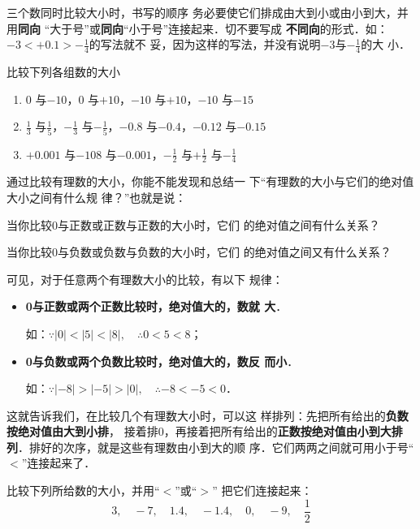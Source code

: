 \begin{rmk}
	三个数同时比较大小时，书写的顺序
	务必要使它们排成由大到小或由小到大，并用\textbf{同向}
	“大于号”或\textbf{同向}“小于号”连接起来．切不要写成
	\textbf{不同向}的形式．如：$-3<+0.1>-\frac{1}{4}$的写法就不
	妥，因为这样的写法，并没有说明$-3$与$-\frac{1}{4}$的大
	小．
\end{rmk}

\begin{ex}
	比较下列各组数的大小
	\begin{enumerate}
		\item $0$ 与$-10$，\quad $0$ 与$+10$，\quad $-10$ 与$+10$，\quad $-10$ 与$-15$
		\item $\frac{1}{3}$ 与$\frac{1}{5}$，\quad $-\frac{1}{3}$ 与$-\frac{1}{5}$，\quad $-0.8$ 与$-0.4$，\quad $-0.12$ 与$-0.15$
		\item $+0.001$ 与$-108$ 与$-0.001$，\quad $-\frac{1}{2}$ 与$+\frac{1}{2}$ 与$-\frac{1}{4}$
	\end{enumerate}
\end{ex}

通过比较有理数的大小，你能不能发现和总结一
下“有理数的大小与它们的绝对值大小之间有什么规
律？”也就是说：

当你比较0与正数或正数与正数的大小时，它们
的绝对值之间有什么关系？

当你比较0与负数或负数与负数的大小时，它们
的绝对值之间又有什么关系？

可见，对于任意两个有理数大小的比较，有以下
规律：
\begin{itemize}
	\item \textbf{0与正数或两个正数比较时，绝对值大的，数就
	大}．
	
	如：$\because |0|<|5|<|8|, \quad \therefore 0<5<8$；
	\item \textbf{0与负数或两个负数比较时，绝对值大的，数反
	而小}．
	
	如：$\because |-8|>|-5|>|0|, \quad \therefore -8<-5<0$．
\end{itemize}

这就告诉我们，在比较几个有理数大小时，可以这
样排列：先把所有给出的\textbf{负数按绝对值由大到小排}，
接着排0，再接着把所有给出的\textbf{正数按绝对值由小到大排
	列}．排好的次序，就是这些有理数由小到大的顺
序．它们两两之间就可用小于号“$<$”连接起来了．

\begin{example}
	比较下列所给数的大小，并用“$<$”或“$>$”
	把它们连接起来：   
	\[3,\quad -7,\quad 1.4,\quad -1.4,\quad 0,\quad -9,\quad \frac{1}{2} \]
\end{example}

